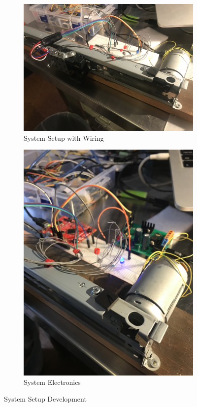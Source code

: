 \documentclass[12pt]{article}
\begin{document}
\begin{figure}[H]
\centering
\begin{subfigure}{.5\textwidth}
  \centering
  \includegraphics[width=1\linewidth]{figures/IMG_5831.jpg}
    \caption{System Setup with Wiring}
    \label{fig:wire}
\end{subfigure}%
\begin{subfigure}{.5\textwidth}
  \centering
  \includegraphics[width=1\linewidth]{figures/IMG_5848.jpg}
    \caption{System Electronics}
    \label{fig:elec}
\end{subfigure}
\caption{System Setup Development}
\end{figure}
\end{document}
